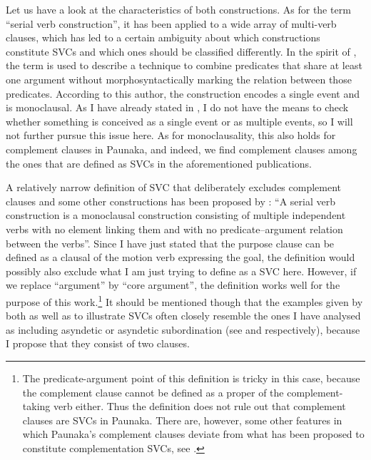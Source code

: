 Let us have a look at the characteristics of both constructions. As for the term “serial verb construction”, it has been applied to a wide array of multi-verb clauses, which has led to a certain ambiguity about which constructions constitute SVCs and which ones should be classified differently. In the spirit of \citet[]{Aikhenvald2006a, Aikhenvald2011,Aikhenvald2018}, the term is used to describe a technique to combine predicates that share at least one argument without morphosyntactically marking the relation between those predicates. According to this author, the construction encodes a single event and is monoclausal. As I have already stated in , I do not have the means to check whether something is conceived as a single event or as multiple events, so I will not further pursue this issue here. As for monoclausality, this also holds for complement clauses in Paunaka, and indeed, we find complement clauses among the ones that are defined as SVCs in the aforementioned publications.

A relatively narrow definition of SVC that deliberately excludes complement clauses and some other constructions has been proposed by \citet[296]{Haspelmath2016}: “A serial verb construction is a monoclausal construction consisting of multiple independent verbs with no element linking them and with no predicate–argument relation between the verbs”. Since I have just stated that the purpose clause can be defined as a clausal  of the motion verb expressing the goal, the definition would possibly also exclude what I am just trying to define as a SVC here. However, if we replace “argument” by “core argument”, the definition works well for the purpose of this work.\footnote{The predicate-argument point of this definition is tricky in this case, because the complement clause cannot be defined as a proper  of the complement-taking verb either. Thus the definition does not rule out that complement clauses are SVCs in Paunaka. There are, however, some other features in which Paunaka’s complement clauses deviate from what has been proposed to constitute complementation SVCs, see .}  It should be mentioned though that the examples given by both \citet[]{Aikhenvald2006a,Aikhenvald2018} as well as \citet[]{Haspelmath2016} to illustrate SVCs often closely resemble the ones I have analysed as including asyndetic  or asyndetic subordination (see  and  respectively), because I propose that they consist of two clauses.

